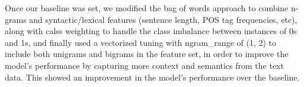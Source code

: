 Once our baseline was set, we modified the bag of words approach to combine n-grams and syntactic/lexical features (sentence length, POS tag frequencies, etc), along with calss weighting to handle the class imbalance between instances of 0s and 1s, and finally used a vectorized tuning with ngram\_range of (1, 2) to include both unigrams and bigrams in the feature set, in order to improve the model's performance by capturing more context and semantics from the text data. This showed an improvement in the model's performance over the baseline. 